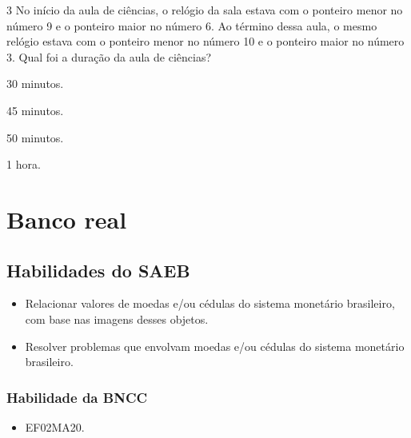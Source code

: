 \num{3} No início da aula de ciências, o relógio da sala estava com o ponteiro
menor no número 9 e o ponteiro maior no número 6. Ao término dessa
aula, o mesmo relógio estava com o ponteiro menor no número
10 e o ponteiro maior no número 3. Qual foi a duração da aula de
ciências?

\begin{escolha}[itemsep=-5pt]
\item 30 minutos.

\item 45 minutos.

\item 50 minutos.

\item 1 hora.
\end{escolha}

\chapter{Banco real}


\section*{Habilidades do SAEB}

\begin{itemize}
\item Relacionar valores de moedas e/ou cédulas do sistema monetário
brasileiro, com base nas imagens desses objetos.

\item Resolver problemas que envolvam moedas e/ou cédulas do sistema
monetário brasileiro.
\end{itemize}

\subsection{Habilidade da BNCC}

\begin{itemize}
\item EF02MA20.
\end{itemize}

